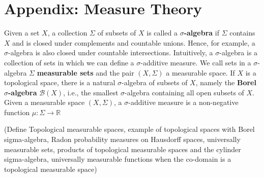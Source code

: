 \documentclass[psamsfonts]{amsart}
\newtheorem{thm}{Theorem}[section]
\theoremstyle{definition}
\theoremstyle{remark}
\numberwithin{equation}{section}
\begin{document}
\section*{Appendix: Measure Theory}

Given a set $X$, a collection $\Sigma$ of subsets of $X$ is called a \textbf{$\sigma$-algebra} if $\Sigma$ contains $X$ and is closed under complements and countable unions. Hence, for example, a $\sigma$-algebra is also closed under countable intersections. Intuitively, a $\sigma$-algebra is a collection of sets in which we can define a $\sigma$-additive measure. We call sets in a $\sigma$-algebra $\Sigma$ \textbf{measurable sets} and the pair $(X,\Sigma)$ a measurable space. If $X$ is a topological space, there is a natural $\sigma$-algebra of subsets of $X$, namely the \textbf{Borel $\sigma$-algebra} $\mathcal{B}(X)$, i.e., the smallest $\sigma$-algebra containing all open subsets of $X$. Given a measurable space $(X,\Sigma)$, a $\sigma$-additive measure is a non-negative function $\mu:\Sigma\rightarrow\mathbb{R}$

(Define Topological measurable spaces, example of topological spaces with Borel sigma-algebra, Radon probability measures on Hausdorff spaces, universally measurable sets, products of topological measurable spaces and the cylinder sigma-algebra, universally measurable functions when the co-domain is a topological measurable space)



\end{document}
